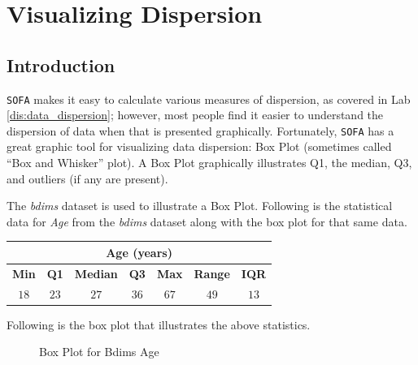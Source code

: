 \chapter{Visualizing Dispersion} \label{vdi:visualizing_dispersion}

\section{Introduction}
\texttt{SOFA} makes it easy to calculate various measures of dispersion, as covered in Lab \ref{dis:data_dispersion}; however, most people find it easier to understand the dispersion of data when that is presented graphically. Fortunately, \texttt{SOFA} has a great graphic tool for visualizing data dispersion: Box Plot (sometimes called ``Box and Whisker'' plot). A Box Plot graphically illustrates Q1, the median, Q3, and outliers (if any are present). 

The \textit{bdims} dataset is used to illustrate a Box Plot. Following is the statistical data for \textit{Age} from the \textit{bdims} dataset along with the box plot for that same data.

\begin{center}
  \begin{tabular}{ccccccc}
    \hline 
    \multicolumn{7}{c}{\textbf{Age (years)}} \\ 
    \hline 
    \textbf{Min} & \textbf{Q1} & \textbf{Median} & \textbf{Q3}  & \textbf{Max} & \textbf{Range} & \textbf{IQR} \\ 
    \hline 
    $ 18 $ & $ 23 $ & $ 27 $ & $ 36 $ & $ 67 $ & $ 49 $ & $ 13 $ \\ 
    \hline 
  \end{tabular} 
\end{center}

Following is the box plot that illustrates the above statistics.

\begin{figure}[H]
  \begin{center}
    \caption{Box Plot for Bdims Age}
  \end{center}
\end{figure}


